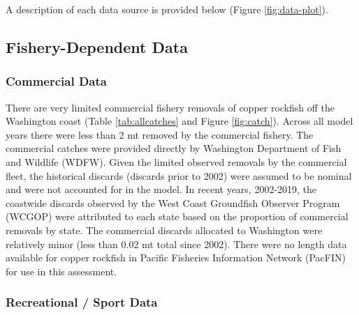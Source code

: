 \documentclass[11pt,
  english,
  a4paper,
]{article}
\begin{document}
\leavevmode\tagmcend\tagstructend


A description of each data source is provided below (Figure \ref{fig:data-plot}).

\leavevmode\tagmcend\tagstructend\par


\hypertarget{fishery-dependent-data}{%
\subsection{Fishery-Dependent Data}\label{fishery-dependent-data}}

\leavevmode\tagmcend\tagstructend


\hypertarget{commercial-data}{%
\subsubsection{Commercial Data}\label{commercial-data}}

\leavevmode\tagmcend\tagstructend


There are very limited commercial fishery removals of copper rockfish off the Washington coast (Table \ref{tab:allcatches} and Figure \ref{fig:catch}). Across all model years there were less than 2 mt removed by the commercial fishery. The commercial catches were provided directly by Washington Department of Fish and Wildlife (WDFW). Given the limited observed removals by the commercial fleet, the historical discards (discards prior to 2002) were assumed to be nominal and were not accounted for in the model. In recent years, 2002-2019, the coastwide discards observed by the West Coast Groundfish Observer Program (WCGOP) were attributed to each state based on the proportion of commercial removals by state. The commercial discards allocated to Washington were relatively minor (less than 0.02 mt total since 2002). There were no length data available for copper rockfish in Pacific Fisheries Information Network (PacFIN) for use in this assessment.

\leavevmode\tagmcend\tagstructend\par


\hypertarget{recreational-sport-data}{%
\subsubsection{Recreational / Sport Data}\label{recreational-sport-data}}
\end{document}
